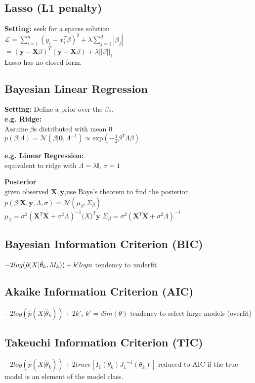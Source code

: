 \subsection*{Lasso (L1 penalty)}
\textbf{Setting:} seek for a sparse solution\\
$\mathcal{L} = \sum_{i=1}^n(y_i-x_i^T\beta)^2+\lambda\sum_{j=1}^d|\beta_j| $\\
$=(\mathbf{y}-\mathbf{X}\beta)^T(\mathbf{y}-\mathbf{X}\beta)+\lambda||\beta||_1$\\
Lasso has no closed form.

\subsection*{Bayesian Linear Regression}
\textbf{Setting:} Define a prior over the $\beta$s.\\
\textbf{e.g. Ridge:}\\
Assume $\beta$s distributed with mean 0\\
$p(\beta|\Lambda){=}\mathcal{N}(\beta|\mathbf{0},\Lambda^{-1}) \propto \mathrm{exp}(-\frac{1}{2}\beta^T\Lambda\beta)$

\textbf{e.g. Linear Regression:}\\
equivalent to ridge with $\Lambda{=}\lambda\mathbb{I}$, $\sigma{=}1$

\textbf{Posterior}\\
given observed $\mathbf{X},\mathbf{y}$,use Baye's theorem to find the posterior\\
$p(\beta|\mathbf{X},\mathbf{y}, \Lambda, \sigma) = \mathcal{N}(\mu_{\beta}, \Sigma_{\beta})$\\
$\mu_\beta = \sigma^2(\mathbf{X}^T\mathbf{X} +\sigma^2\Lambda)^{-1}\mathbf(X)^T\mathbf{y}$
$\Sigma_\beta = \sigma^2(\mathbf{X}^T\mathbf{X} +\sigma^2\Lambda)^{-1}$

\subsection*{Bayesian Information Criterion (BIC)}
$-2log(\hat{p}(X|\hat{\theta}_k,M_k))+k'log \space n$ tendency to underfit

\subsection*{Akaike Information Criterion (AIC)}
$-2log(\hat{p}(X|\hat{\theta}_k))+2k'$, $k'=dim(\theta)$ tendency to select large models (overfit)

\subsection*{Takeuchi Information Criterion (TIC)}
${-2log(\hat{p}(X|\hat{\theta}_k))+2 trace[I_1(\theta_k){J_1}^{-1}(\theta_k)]}$ 
reduced to AIC if the true model is an element of the model class.

